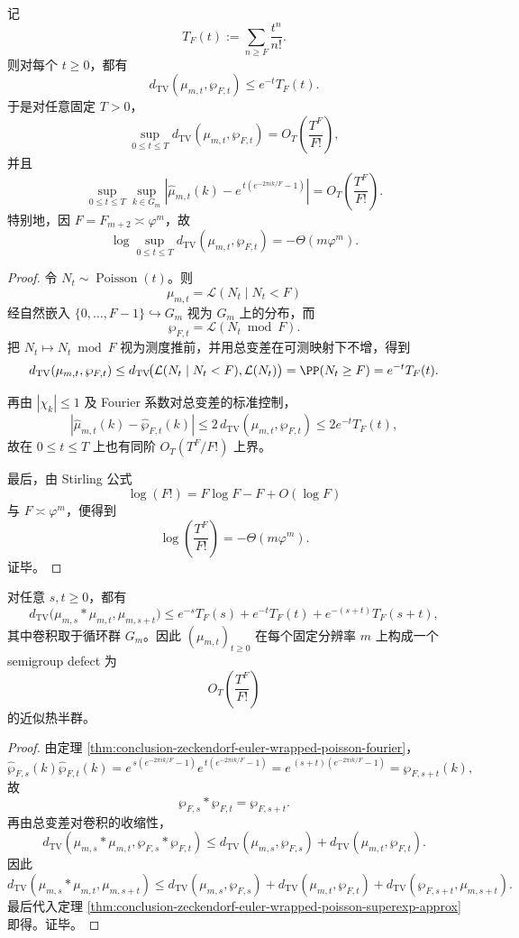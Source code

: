 \begin{theorem}\label{thm:conclusion-zeckendorf-euler-wrapped-poisson-superexp-approx}
记
\[
T_F(t):=\sum_{n\ge F}\frac{t^n}{n!}.
\]
则对每个 \(t\ge 0\)，都有
\[
d_{\mathrm{TV}}(\mu_{m,t},\wp_{F,t})\le e^{-t}T_F(t).
\]
于是对任意固定 \(T>0\)，
\[
\sup_{0\le t\le T}d_{\mathrm{TV}}(\mu_{m,t},\wp_{F,t})
=
O_T\!\left(\frac{T^F}{F!}\right),
\]
并且
\[
\sup_{0\le t\le T}\sup_{k\in G_m}
\left|
\widehat\mu_{m,t}(k)-e^{\,t(e^{-2\pi i k/F}-1)}
\right|
=
O_T\!\left(\frac{T^F}{F!}\right).
\]
特别地，因 \(F=F_{m+2}\asymp \varphi^m\)，故
\[
\log \sup_{0\le t\le T}d_{\mathrm{TV}}(\mu_{m,t},\wp_{F,t})
=
-\Theta(m\varphi^m).
\]
\end{theorem}
\begin{proof}
令 \(N_t\sim \operatorname{Poisson}(t)\)。则
\[
\mu_{m,t}=\mathcal L(N_t\mid N_t<F)
\]
经自然嵌入 \(\{0,\dots,F-1\}\hookrightarrow G_m\) 视为 \(G_m\) 上的分布，而
\[
\wp_{F,t}=\mathcal L(N_t\bmod F).
\]
把 \(N_t\mapsto N_t\bmod F\) 视为测度推前，并用总变差在可测映射下不增，得到
\[
d_{\mathrm{TV}}(\mu_{m,t},\wp_{F,t})
\le
d_{\mathrm{TV}}\!\bigl(\mathcal L(N_t\mid N_t<F),\mathcal L(N_t)\bigr)
=
\PP(N_t\ge F)
=
e^{-t}T_F(t).
\]

再由 \(|\chi_k|\le 1\) 及 Fourier 系数对总变差的标准控制，
\[
\left|\widehat\mu_{m,t}(k)-\widehat\wp_{F,t}(k)\right|
\le 2\,d_{\mathrm{TV}}(\mu_{m,t},\wp_{F,t})
\le 2e^{-t}T_F(t),
\]
故在 \(0\le t\le T\) 上也有同阶 \(O_T(T^F/F!)\) 上界。

最后，由 Stirling 公式
\[
\log(F!)=F\log F-F+O(\log F)
\]
与 \(F\asymp \varphi^m\)，便得到
\[
\log\!\left(\frac{T^F}{F!}\right)=-\Theta(m\varphi^m).
\]
证毕。
\end{proof}

\begin{corollary}\label{cor:conclusion-zeckendorf-euler-approx-semigroup-defect}
对任意 \(s,t\ge 0\)，都有
\[
d_{\mathrm{TV}}\!\bigl(\mu_{m,s}*\mu_{m,t},\mu_{m,s+t}\bigr)
\le
e^{-s}T_F(s)+e^{-t}T_F(t)+e^{-(s+t)}T_F(s+t),
\]
其中卷积取于循环群 \(G_m\)。因此 \((\mu_{m,t})_{t\ge 0}\) 在每个固定分辨率 \(m\) 上构成一个 semigroup defect 为
\[
O_T\!\left(\frac{T^F}{F!}\right)
\]
的近似热半群。
\end{corollary}
\begin{proof}
由定理 \ref{thm:conclusion-zeckendorf-euler-wrapped-poisson-fourier}，
\[
\widehat\wp_{F,s}(k)\widehat\wp_{F,t}(k)
=
e^{\,s(e^{-2\pi i k/F}-1)}e^{\,t(e^{-2\pi i k/F}-1)}
=
e^{\,(s+t)(e^{-2\pi i k/F}-1)}
=
\widehat\wp_{F,s+t}(k),
\]
故
\[
\wp_{F,s}*\wp_{F,t}=\wp_{F,s+t}.
\]
再由总变差对卷积的收缩性，
\[
d_{\mathrm{TV}}(\mu_{m,s}*\mu_{m,t},\wp_{F,s}*\wp_{F,t})
\le
d_{\mathrm{TV}}(\mu_{m,s},\wp_{F,s})
+
d_{\mathrm{TV}}(\mu_{m,t},\wp_{F,t}).
\]
因此
\[
d_{\mathrm{TV}}(\mu_{m,s}*\mu_{m,t},\mu_{m,s+t})
\le
d_{\mathrm{TV}}(\mu_{m,s},\wp_{F,s})
+
d_{\mathrm{TV}}(\mu_{m,t},\wp_{F,t})
+
d_{\mathrm{TV}}(\wp_{F,s+t},\mu_{m,s+t}).
\]
最后代入定理 \ref{thm:conclusion-zeckendorf-euler-wrapped-poisson-superexp-approx} 即得。证毕。
\end{proof}

